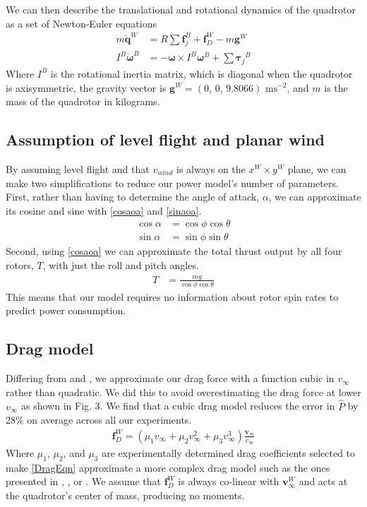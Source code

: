 We can then describe the translational and rotational dynamics of the quadrotor as a set of Newton-Euler equations
\begin{align}
    \label{NewtonEqn}
    m \ddot{\mathbf{q}}^W &= R \sum{\mathbf{f}_j^B} + \mathbf{f}_D^W - m\mathbf{g}^W \\
    \label{EulerEqn}
    I^B \dot{\mathbf{\omega}}^B &= -\mathbf{\omega} \times I^B \mathbf{\omega}^B + \sum{\mathbf{\tau}_j}^B
\end{align}
Where $I^B$ is the rotational inertia matrix, which is diagonal when the quadrotor is axisymmetric, the gravity vector is $\mathbf{g}^W=\left(0 \text{, } 0 \text{, } 9.8066\right) \text{ ms}^{-2}$, and $m$ is the mass of the quadrotor in kilograms.

\subsection{Assumption of level flight and planar wind}
By assuming level flight and that $v_{wind}$ is always on the $x^W \times y^W$ plane, we can make two simplifications to reduce our power model's number of parameters. First, rather than having to determine the angle of attack, $\alpha$, we can approximate its cosine and sine with \eqref{cosaoa} and \eqref{sinaoa}.
\begin{align}
	\label{cosaoa}
	\cos \alpha &= \cos \phi \cos \theta \\
	\label{sinaoa}
	\sin \alpha &= \sin \phi \sin \theta
\end{align}
Second, using \eqref{cosaoa} we can approximate the total thrust output by all four rotors, $T$, with just the roll and pitch angles.
\begin{align}
\label{totT}
T &= \frac{mg}{\cos \phi \cos \theta}
\end{align}
This means that our model requires no information about rotor spin rates to predict power consumption.

\subsection{Drag model}
Differing from \cite{tagliabue2019model} and \cite{schulz2015high}, we approximate our drag force with a function cubic in $v_\infty$ rather than quadratic. We did this to avoid overestimating the drag force at lower $v_\infty$ as shown in Fig. 3. We find that a cubic drag model reduces the error in $\hat{P}$ by 28\% on average across all our experiments.
\begin{align}
    \label{DragEqn}
    \mathbf{f}_D^W = \left(\mu_1 v_\infty + \mu_2 v_\infty^2 + \mu_3 v_\infty^3 \right)\frac{\mathbf{v}_\infty}{v_\infty} 
\end{align}
Where $\mu_1$, $\mu_2$, and $\mu_3$ are experimentally determined drag coefficients selected to make \eqref{DragEqn} approximate a more complex drag model such as the ones presented in \cite{huang2009aerodynamics}, \cite{bangura2012nonlinear}, or \cite{leishman2014quadrotors}. We assume that $\mathbf{f}_D^W$ is always co-linear with $\mathbf{v}_\infty^W$ and acts at the quadrotor's center of mass, producing no moments.

